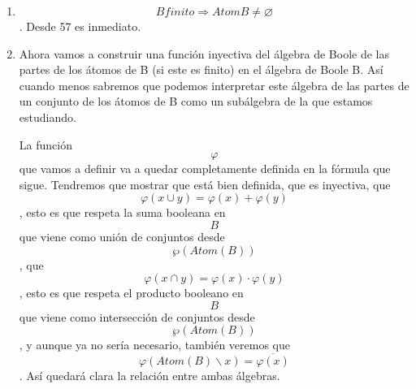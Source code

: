 \begin{enumerate}
\begin{enumerate}
\begin{enumerate}
\begin{enumerate}
        \[\forall{P \subset \left\lbrack B \right)}{\langle{P, \supseteq}\rangle}\mathit{orden}\mathit{total}\Rightarrow\exists!{x \in \underset{X \in P}{\cap}}X\mathit{atom}(x)\]
      \end{enumerate}
    \item
      \[B\mathit{finito}\Rightarrow\mathit{Atom}{B \neq \varnothing}\].
      Desde 57 es inmediato.
    \item
      Ahora vamos a construir una función inyectiva del álgebra de Boole
      de las partes de los átomos de B (si este es finito) en el álgebra
      de Boole B. Así cuando menos sa\-bremos que podemos interpretar
      este álgebra de las partes de un conjunto de los áto\-mos de B
      como un subálgebra de la que estamos estudiando.

      La función \[\varphi\]que vamos a definir va a quedar
      completamente definida en la fór\-mula que sigue. Tendremos que
      mostrar que está bien definida, que es inyectiva, que
      \[\varphi{{({x \cup y})} = \varphi}{{(x)} + \varphi}{(y)}\], esto
      es que respeta la suma booleana en \[B\]que viene como unión de
      conjuntos desde \[\wp\left( {\mathit{Atom}{(B)}} \right)\], que
      \[\varphi{{({x \cap y})} = \varphi}{{(x)} \cdot \varphi}{(y)}\],
      esto es que respeta el producto booleano en \[B\]que viene como
      intersección de conjun\-tos desde
      \[\wp\left( {\mathit{Atom}{(B)}} \right)\] , y aunque ya no sería
      necesario, también veremos que
      \[\varphi{\left( {\mathit{Atom}{{(B)} \smallsetminus x}} \right) = \overline{\varphi(x)}}\]
      . Así quedará clara la relación entre ambas álgebras.


\end{enumerate}
\end{enumerate}
\end{enumerate}
